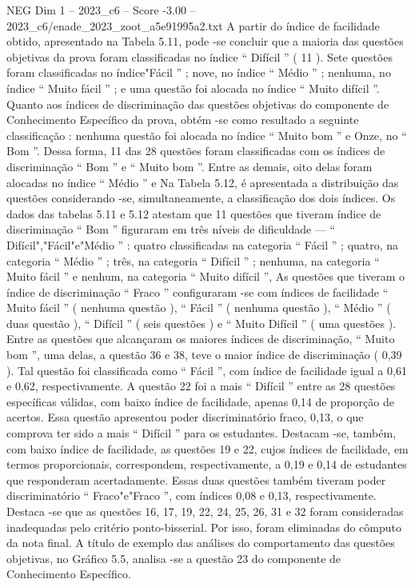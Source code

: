 \begin{textsample}{NEG Dim 1 – 2023\_c6 – Score -3.00 – 2023\_c6/enade\_2023\_zoot\_a5e91995a2.txt}
A partir do índice de facilidade obtido, apresentado na Tabela 5.11, pode -se concluir que a maioria das questões objetivas da prova foram classificadas no índice “ Difícil ” ( 11 ).
Sete questões foram classificadas no índice"Fácil ” ; nove, no índice “ Médio ” ; nenhuma, no índice “ Muito fácil ” ; e uma questão foi alocada no índice “ Muito difícil ”.
Quanto aos índices de discriminação das questões objetivas do componente de Conhecimento Específico da prova, obtém -se como resultado a seguinte classificação : nenhuma questão foi alocada no índice “ Muito bom ” e Onze, no “ Bom ”.
Dessa forma, 11 das 28 questões foram classificadas com os índices de discriminação “ Bom ” e “ Muito bom ”.
Entre as demais, oito delas foram alocadas no índice “ Médio ” e Na Tabela 5.12, é apresentada a distribuição das questões considerando -se, simultaneamente, a classificação dos dois índices.
Os dados das tabelas 5.11 e 5.12 atestam que 11 questões que tiveram índice de discriminação “ Bom ” figuraram em três níveis de dificuldade — “ Difícil","Fácil"e"Médio ” : quatro classificadas na categoria “ Fácil ” ; quatro, na categoria “ Médio ” ; três, na categoria “ Difícil ” ; nenhuma, na categoria “ Muito fácil ” e nenhum, na categoria “ Muito difícil ”, As questões que tiveram o índice de discriminação “ Fraco ” configuraram -se com índices de facilidade “ Muito fácil ” ( nenhuma questão ), “ Fácil ” ( nenhuma questão ), “ Médio ” ( duas questão ), “ Difícil ” ( seis questões ) e “ Muito Difícil ” ( uma questões ).
Entre as questões que alcançaram os maiores índices de discriminação, “ Muito bom ”, uma delas, a questão 36 e 38, teve o maior índice de discriminação ( 0,39 ).
Tal questão foi classificada como “ Fácil ”, com índice de facilidade igual a 0,61 e 0,62, respectivamente.
A questão 22 foi a mais “ Difícil ” entre as 28 questões específicas válidas, com baixo índice de facilidade, apenas 0,14 de proporção de acertos.
Essa questão apresentou poder discriminatório fraco, 0,13, o que comprova ter sido a mais “ Difícil ” para os estudantes.
Destacam -se, também, com baixo índice de facilidade, as questões 19 e 22, cujos índices de facilidade, em termos proporcionais, correspondem, respectivamente, a 0,19 e 0,14 de estudantes que responderam acertadamente.
Essas duas questões também tiveram poder discriminatório “ Fraco"e"Fraco ”, com índices 0,08 e 0,13, respectivamente.
Destaca -se que as questões 16, 17, 19, 22, 24, 25, 26, 31 e 32 foram consideradas inadequadas pelo critério ponto-bisserial.
Por isso, foram eliminadas do cômputo da nota final.
A título de exemplo das análises do comportamento das questões objetivas, no Gráfico 5.5, analisa -se a questão 23 do componente de Conhecimento Específico.

\end{textsample}
